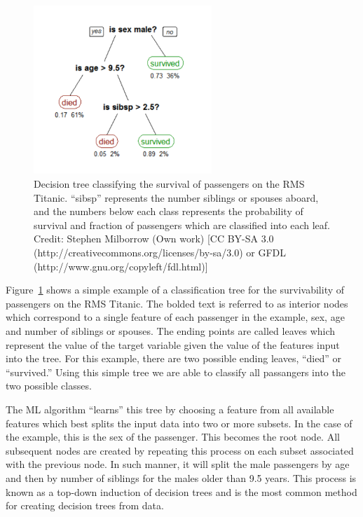 \begin{figure}[ht]
	\begin{center}
		\includegraphics[width=0.6\textwidth]{figures/CART_tree_titanic_survivors.pdf} 
	\end{center}
	\caption[An example of a classification tree.]{Decision tree classifying the survival of passengers on the RMS Titanic. ``sibsp'' represents the number siblings or spouses aboard, and the numbers below each class represents the probability of survival and fraction of passengers which are classified into each leaf. Credit: Stephen Milborrow (Own work) [CC BY-SA 3.0 (http://creativecommons.org/licenses/by-sa/3.0) or GFDL (http://www.gnu.org/copyleft/fdl.html)]}
	\label{fig: cart tree} 
\end{figure}

Figure~\ref{fig: cart tree} shows a simple example of a classification tree for the survivability of passengers on the RMS Titanic. The bolded text is referred to as interior nodes which correspond to a single feature of each passenger in the example, sex, age and number of siblings or spouses. The ending points are called leaves which represent the value of the target variable given the value of the features input into the tree. For this example, there are two possible ending leaves, ``died'' or ``survived.'' Using this simple tree we are able to classify all passangers into the two possible classes. 

The ML algorithm ``learns'' this tree by choosing a feature from all available features which best splits the input data into two or more subsets. In the case of the example, this is the sex of the passenger. This becomes the root node. All subsequent nodes are created by repeating this process on each subset associated with the previous node. In such manner, it will split the male passengers by age and then by number of siblings for the males older than 9.5 years. This process is known as a top-down induction of decision trees and is the most common method for creating decision trees from data.

